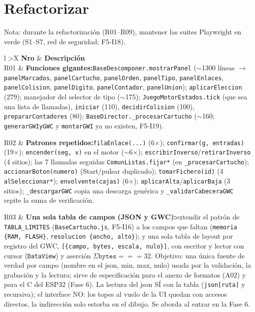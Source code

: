 \section*{Refactorizar}

Nota: durante la refactorización (R01--R09), mantener las suites
Playwright en verde (S1--S7, red de seguridad; F5-I18).

\begin{xltabular}{\textwidth}{l >{\RaggedRight\arraybackslash}X}
	\toprule
	\textbf{Nro} & \textbf{Descripción} \\
	\midrule
	\endhead
	R01 & \textbf{Funciones gigantes:}\newline \texttt{BaseDescomponer.mostrarPanel} ($\sim$1300 líneas $\to$ \texttt{panelMarcados}, \texttt{panelCartucho}, \texttt{panelOrden}, \texttt{panelTipo}, \texttt{panelEnlaces}, \texttt{panelColision}, \texttt{panelDigito}, \texttt{panelContador}, \texttt{panelUnion}); \texttt{aplicarEleccion} (279); manejador del selector de tipo ($\sim$175); \texttt{JuegoMotorEstados.tick} (que sea una lista de llamadas), \texttt{iniciar} (110), \texttt{decidirColision} (100), \texttt{prepararContadores} (80); \texttt{BaseDirector.\_procesarCartucho} ($\sim$160; \texttt{generarGWIyGWC} y \texttt{montarGWI} ya no existen, F5-I19). \\
	\midrule
	
	R02 & \textbf{Patrones repetidos:}\newline \texttt{filaEnlace(...)} (6$\times$); \texttt{confirmar(g, entradas)} (19$\times$); \texttt{encender(seg, v)} en el motor ($\sim$6$\times$); \texttt{escribirInverso}/\texttt{retirarInverso} (4 sitios); las 7 llamadas seguidas \texttt{ComunListas.fijar*} (en \texttt{\_procesarCartucho}); \texttt{accionarBoton(numero)} (Start/pulsar duplicado); \texttt{tomarFichero(id)} (4 \texttt{alSeleccionar*}); \texttt{envolvente(cajas)} (6$\times$); \texttt{aplicarAlta}/\texttt{aplicarBaja} (3 sitios); \texttt{\_descargarGWC} copia una descarga genérica y \texttt{\_validarCabeceraGWC} repite la suma de verificación. \\
	\midrule
	
	R03 & \textbf{Una sola tabla de campos (JSON y GWC):}\newline extendir el patrón de \texttt{TABLA\_LIMITES} (\texttt{BaseCartucho.js}, F5-I16) a los campos que faltan (\texttt{memoria \{RAM, FLASH\}}, \texttt{resolucion \{ancho, alto\}}); y una sola tabla de layout por registro del GWC, \texttt{[\{campo, bytes, escala, nulo\}]}, con escritor y lector con cursor (\texttt{DataView}) y aserción $\Sigma\texttt{bytes} === 32$. Objetivo: una única fuente de verdad por campo (nombre en el json, min, max, nulo) usada por la validación, la grabación y la lectura; sirve de especificación para el anexo de formatos (A02) y para el C del ESP32 (Fase 6). La lectura del json SÍ con la tabla (\texttt{json[ruta]} y recursiva); el interface NO: los topes al vuelo de la UI quedan con accesos directos, la indirección solo estorba en el dibujo. Se aborda al entrar en la Fase 6. \\
	\midrule
	

\end{xltabular}
